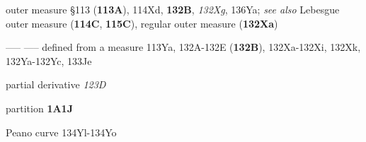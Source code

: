 



outer measure \S113 ({\bf 113A}), 114Xd, {\bf 132B}, {\it 132Xg},
136Ya;  
  {\it see also} Lebesgue outer measure ({\bf 114C}, {\bf 115C}),
  regular outer measure ({\bf 132Xa})

----- ----- defined from a measure 113Ya,
132A-132E ({\bf 132B}), 
132Xa-132Xi, 
132Xk, 132Ya-132Yc, 
133Je














\indexmedskip
















partial derivative {\it 123D}











partition {\bf 1A1J}





Peano curve 134Yl-134Yo 





















































